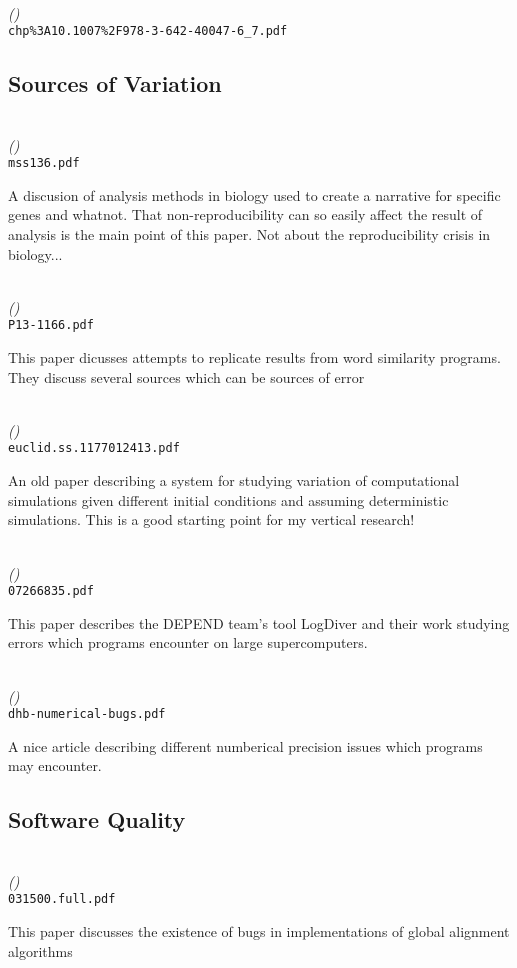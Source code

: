 \documentclass[american]{article}
\newenvironment{refdef}[2] {
	\noindent \textbf{\citetitle{#1}} \cite{#1}\\ \citejournalorbooktitle{#1} \textit{(\citeyear{#1})}\\ \texttt{#2} \vspace{0.2in} \par 
} {
\vspace{0.2in}
}
\begin{document}
\begin{refdef}{Wilke2013}{chp\%3A10.1007\%2F978-3-642-40047-6\_7.pdf}
\end{refdef}

\subsection{Sources of Variation} \label{sec:reference-descriptions-sources}

\begin{refdef}{doi:10.1093/molbev/mss136}{mss136.pdf}
A discusion of analysis methods in biology used to create a narrative for specific genes and whatnot. That non-reproducibility can so easily affect the result of analysis is the main point of this paper. Not about the reproducibility crisis in biology...
\end{refdef}

\begin{refdef}{FokkensPostmaPedersen}{P13-1166.pdf}
This paper dicusses attempts to replicate results from word similarity programs. They discuss several sources which can be sources of error
\end{refdef}

\begin{refdef}{sacks1989}{euclid.ss.1177012413.pdf}
An old paper describing a system for studying variation of computational simulations given different initial conditions and assuming deterministic simulations. This is a good starting point for my vertical research!
\end{refdef}

\begin{refdef}{DEPEND-Resiliance}{07266835.pdf}
This paper describes the DEPEND team's tool LogDiver and their work studying errors which programs encounter on large supercomputers.
\end{refdef}

\begin{refdef}{dhb-numerical-bugs}{dhb-numerical-bugs.pdf}
A nice article describing different numberical precision issues which programs may encounter.
\end{refdef}

\subsection{Software Quality} \label{sec:reference-descriptions-quality}

\begin{refdef}{Flouri031500}{031500.full.pdf}
This paper discusses the existence of bugs in implementations of global alignment algorithms
\end{refdef}
\end{document}
